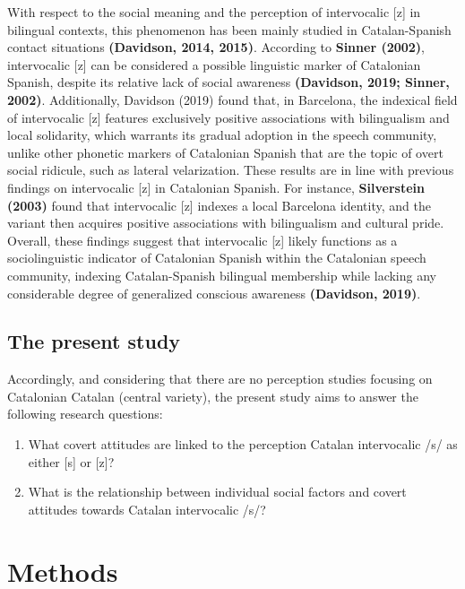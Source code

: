 \documentclass[
  a4paper,
  11pt,
  twocolumn]{article}
\begin{document}
With respect to the social meaning and the perception of intervocalic
{[}z{]} in bilingual contexts, this phenomenon has been mainly studied
in Catalan-Spanish contact situations \textbf{(Davidson, 2014, 2015)}.
According to \textbf{Sinner (2002)}, intervocalic {[}z{]} can be
considered a possible linguistic marker of Catalonian Spanish, despite
its relative lack of social awareness \textbf{(Davidson, 2019; Sinner,
2002)}. Additionally, Davidson (2019) found that, in Barcelona, the
indexical field of intervocalic {[}z{]} features exclusively positive
associations with bilingualism and local solidarity, which warrants its
gradual adoption in the speech community, unlike other phonetic markers
of Catalonian Spanish that are the topic of overt social ridicule, such
as lateral velarization. These results are in line with previous
findings on intervocalic {[}z{]} in Catalonian Spanish. For instance,
\textbf{Silverstein (2003)} found that intervocalic {[}z{]} indexes a
local Barcelona identity, and the variant then acquires positive
associations with bilingualism and cultural pride. Overall, these
findings suggest that intervocalic {[}z{]} likely functions as a
sociolinguistic indicator of Catalonian Spanish within the Catalonian
speech community, indexing Catalan-Spanish bilingual membership while
lacking any considerable degree of generalized conscious awareness
\textbf{(Davidson, 2019)}.

\subsection{The present study}

Accordingly, and considering that there are no perception studies
focusing on Catalonian Catalan (central variety), the present study aims
to answer the following research questions:

\begin{enumerate}
\def\labelenumi{\arabic{enumi}.}
\item
  What covert attitudes are linked to the perception Catalan
  intervocalic /s/ as either {[}s{]} or {[}z{]}?
\item
  What is the relationship between individual social factors and covert
  attitudes towards Catalan intervocalic /s/?
\end{enumerate}

\section{Methods}
\end{document}
